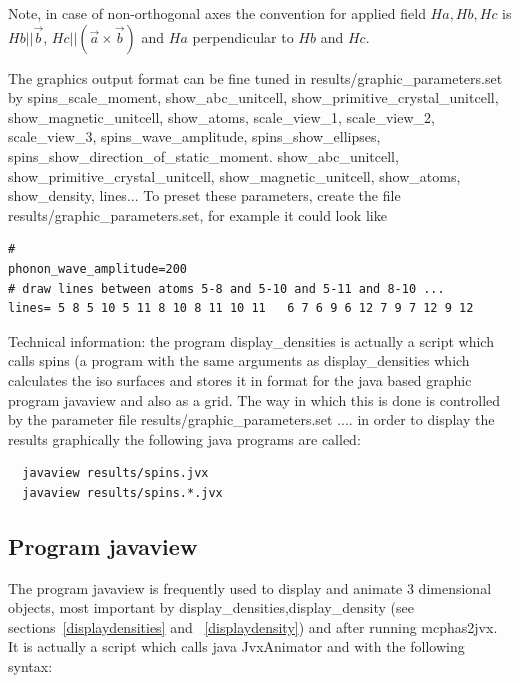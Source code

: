                          Note, in case of non-orthogonal axes the convention 
                           for applied field $Ha, Hb,Hc$ 
                            is $Hb||\vec b$, $Hc||(\vec a \times \vec b)$ and $Ha$ perpendicular to $Hb$ and $Hc$.


  The graphics output format can be fine tuned in {\prg results/graphic\_parameters.set} 
  by  {\prg spins\_scale\_moment},
{\prg show\_abc\_unitcell, show\_primitive\_crystal\_unitcell, show\_magnetic\_unitcell, show\_atoms, 
scale\_view\_1,
scale\_view\_2, scale\_view\_3},  
{\prg spins\_wave\_amplitude, spins\_show\_ellipses, spins\_show\_direction\_of\_static\_moment}.
{\prg show\_abc\_unitcell, show\_primitive\_crystal\_unitcell, show\_magnetic\_unitcell, show\_atoms, %
 show\_density}, {\prg lines}...
To preset these parameters, create the file {\prg results/graphic\_parameters.set}, for example
it could look like
\begin{verbatim}
#
phonon_wave_amplitude=200
# draw lines between atoms 5-8 and 5-10 and 5-11 and 8-10 ...
lines= 5 8 5 10 5 11 8 10 8 11 10 11   6 7 6 9 6 12 7 9 7 12 9 12
\end{verbatim}

Technical information: the program {\prg display\_densities} 
is actually a script which
calls  {\prg spins} 
 (a program with the same arguments as {\prg display\_densities}
which calculates the iso surfaces and stores
it in format for the java based graphic program {\prg javaview} and
also as a grid. The way in which this is done is controlled by 
the parameter file {\prg results/graphic\_parameters.set}
.... in  order to display the results graphically the following java
programs are called:
\begin{verbatim}
  javaview results/spins.jvx
  javaview results/spins.*.jvx
\end{verbatim}

\subsection{Program {\prg javaview}}

The program javaview is frequently used to display and animate 3 dimensional objects,
most important by {\prg display\_densities},{\prg display\_density} 
(see sections~\ref{displaydensities} and ~\ref{displaydensity}) and after running
{\prg mcphas2jvx}. It is actually a script which calls {\prg java JvxAnimator} and
with the following syntax:

